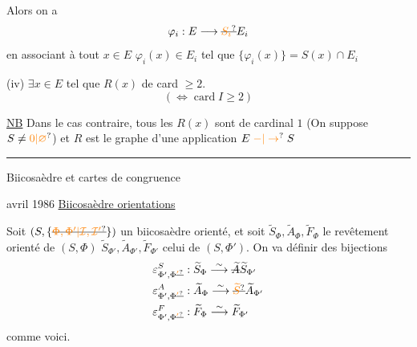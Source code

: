 Alors on a
\[
\varphi_i:E\longrightarrow\deleted{\unsure{S_i}}E_i
\]
en associant à tout $x\in E$ 
 $\varphi_i(x)\in E_i$ tel que $\{\varphi_i(x)\}=S(x)\cap E_i$

(iv)  $\exists x\in E$ tel que $R(x)$ de card $\geq2$.
\[
(\Longleftrightarrow\operatorname{card}I\geq2)
\]

\uline{NB} Dans le cas contraire, tous les $R(x)$
sont de cardinal $1$ (On suppose $S\ne\unsure{0|\varnothing}$)
et $R$ est le graphe d'une
application $E\mathrel{\unsure{-|\to}}S$

\begin{center}\rule{1.2cm}{.6pt}\end{center}
Biicosaèdre et cartes
de congruence

avril 1986
\uline{Biicosaèdre  orientations}

Soit $(S,\{\deleted{\unsure{\Phi,\Phi'|\mathcal I,\mathcal I'}}\})$ un biicosaèdre  orienté, et soit
$\widetilde S_\Phi,\widetilde A_\Phi,\widetilde F_\Phi$ le revêtement  orienté de $(S,\Phi)$
$\widetilde S_{\Phi'},\widetilde A_{\Phi'},\widetilde F_{\Phi'}$ celui de $(S,\Phi')$.
 On va définir des
bijections
\[
\begin{aligned}
\varepsilon^S_{\Phi',\Phi\deleted{\unsure{'}}}&:\widetilde S_\Phi\mathrel{\overset{\sim}{\longrightarrow}}\deleted{\widetilde A}\widetilde S_{\Phi'}\\
\varepsilon^A_{\Phi',\Phi\deleted{\unsure{'}}}&:\widetilde A_\Phi\mathrel{\overset{\sim}{\longrightarrow}}\deleted{\unsure{\widetilde S}}\widetilde A_{\Phi'}\\
\varepsilon^F_{\Phi',\Phi\deleted{\unsure{'}}}&:\widetilde F_\Phi\mathrel{\overset{\sim}{\longrightarrow}}\widetilde F_{\Phi'}
\end{aligned}
\]
comme voici.

